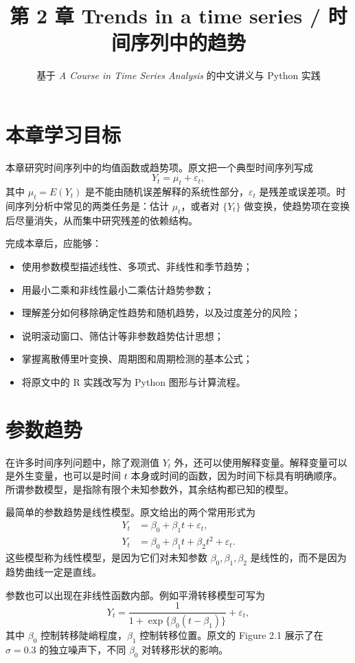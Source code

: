 \documentclass[11pt,a4paper]{ctexart}
\title{第 2 章 \quad Trends in a time series / 时间序列中的趋势}
\author{基于 \textit{A Course in Time Series Analysis} 的中文讲义与 Python 实践}
\date{}
\begin{document}
\maketitle

\section*{本章学习目标}

本章研究时间序列中的均值函数或趋势项。原文把一个典型时间序列写成
\[
  Y_t=\mu_t+\varepsilon_t,
\]
其中 \(\mu_t=E(Y_t)\) 是不能由随机误差解释的系统性部分，\(\varepsilon_t\) 是残差或误差项。时间序列分析中常见的两类任务是：估计 \(\mu_t\)，或者对 \(\{Y_t\}\) 做变换，使趋势项在变换后尽量消失，从而集中研究残差的依赖结构。

完成本章后，应能够：
\begin{itemize}
  \item 使用参数模型描述线性、多项式、非线性和季节趋势；
  \item 用最小二乘和非线性最小二乘估计趋势参数；
  \item 理解差分如何移除确定性趋势和随机趋势，以及过度差分的风险；
  \item 说明滚动窗口、筛估计等非参数趋势估计思想；
  \item 掌握离散傅里叶变换、周期图和周期检测的基本公式；
  \item 将原文中的 R 实践改写为 Python 图形与计算流程。
\end{itemize}

\section{参数趋势}

在许多时间序列问题中，除了观测值 \(Y_t\) 外，还可以使用解释变量。解释变量可以是外生变量，也可以是时间 \(t\) 本身或时间的函数，因为时间下标具有明确顺序。所谓参数模型，是指除有限个未知参数外，其余结构都已知的模型。

最简单的参数趋势是线性模型。原文给出的两个常用形式为
\begin{align}
  Y_t &= \beta_0+\beta_1 t+\varepsilon_t, \tag{2.1}\\
  Y_t &= \beta_0+\beta_1 t+\beta_2 t^2+\varepsilon_t. \tag{2.2}
\end{align}
这些模型称为线性模型，是因为它们对未知参数 \(\beta_0,\beta_1,\beta_2\) 是线性的，而不是因为趋势曲线一定是直线。

参数也可以出现在非线性函数内部。例如平滑转移模型可写为
\begin{equation}
  Y_t=\frac{1}{1+\exp\{\beta_0(t-\beta_1)\}}+\varepsilon_t, \tag{2.3}
\end{equation}
其中 \(\beta_0\) 控制转移陡峭程度，\(\beta_1\) 控制转移位置。原文的 Figure 2.1 展示了在 \(\sigma=0.3\) 的独立噪声下，不同 \(\beta_0\) 对转移形状的影响。
\end{document}
